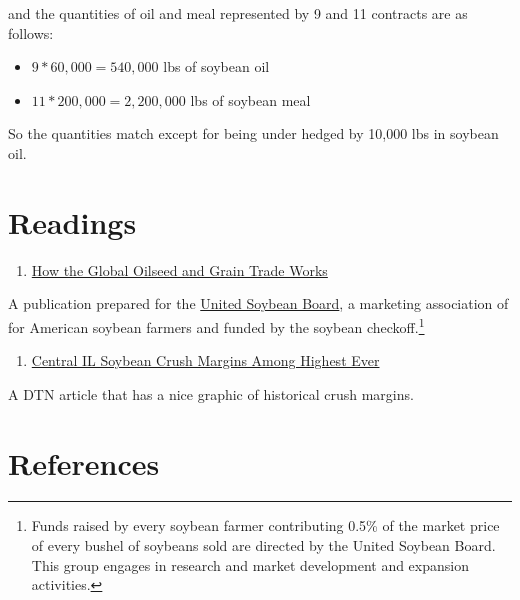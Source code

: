 \documentclass[
  letterpaper,
  DIV=11,
  numbers=noendperiod]{scrreprt}
\providecommand{\tightlist}{%
  \setlength{\itemsep}{0pt}\setlength{\parskip}{0pt}}\usepackage{longtable,booktabs,array}
\begin{document}
and the quantities of oil and meal represented by 9 and 11 contracts are
as follows:

\begin{itemize}
\tightlist
\item
  \(9*60,000 = 540,000\) lbs of soybean oil
\item
  \(11*200,000 = 2,200,000\) lbs of soybean meal
\end{itemize}

So the quantities match except for being under hedged by 10,000 lbs in
soybean oil.

\hypertarget{readings-4}{%
\section{Readings}\label{readings-4}}

\begin{enumerate}
\def\labelenumi{\arabic{enumi}.}
\tightlist
\item
  \href{http://unitedsoybean.org/wp-content/uploads/2013/07/RevisedJan12_GlobalOilSeedGrainTrade_2011.pdf}{How
  the Global Oilseed and Grain Trade Works}
\end{enumerate}

A publication prepared for the \href{http://unitedsoybean.org/}{United
Soybean Board}, a marketing association of for American soybean farmers
and funded by the soybean checkoff.\footnote{Funds raised by every
  soybean farmer contributing 0.5\% of the market price of every bushel
  of soybeans sold are directed by the United Soybean Board. This group
  engages in research and market development and expansion activities.}

\begin{enumerate}
\def\labelenumi{\arabic{enumi}.}
\setcounter{enumi}{1}
\tightlist
\item
  \href{http://www.dtnprogressivefarmer.com/dtnag/common/link.do;jsessionid=CA98693F5E3C9EF37EC1F032464A6388.agfreejvm1?symbolicName=/ag/blogs/template1\&blogHandle=agfundamental\&blogEntryId=8a82c0bc372e8fba0137a8324dd704cf}{Central
  IL Soybean Crush Margins Among Highest Ever}
\end{enumerate}

A DTN article that has a nice graphic of historical crush margins.

\hypertarget{references-1}{%
\section{References}\label{references-1}}
\end{document}
